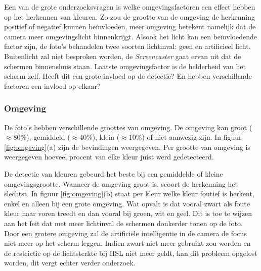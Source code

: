 Een van de grote onderzoeksvragen is welke omgevingsfactoren een effect hebben op het herkennen van kleuren. Zo zou de grootte van de omgeving de herkenning positief of negatief kunnen beïnvloeden, meer omgeving betekent namelijk dat de camera meer omgevingslicht binnenkrijgt. Alsook het licht kan een beïnvloedende factor zijn, de foto's behandelen twee soorten lichtinval: geen en artificieel licht. Buitenlicht zal niet besproken worden, de {\it Screencaster} gaat ervan uit dat de schermen binnenshuis staan. Laatste omgevingsfactor is de helderheid van het scherm zelf. Heeft dit een grote invloed op de detectie? En hebben verschillende factoren een invloed op elkaar?

\subsubsection{Omgeving}
De foto's hebben verschillende groottes van omgeving. De omgeving kan groot ($\approx 80\%$), gemiddeld ($\approx 40\%$), klein ($\approx 10\%$) of niet aanwezig zijn. In figuur \ref{fig:omgeving}(a) zijn de bevindingen weergegeven. Per grootte van omgeving is weergegeven hoeveel procent van elke kleur juist werd gedetecteerd.

De detectie van kleuren gebeurd het beste bij een gemiddelde of kleine omgevingsgrootte. Wanneer de omgeving groot is, scoort de herkenning het slechtst. In figuur \ref{fig:omgeving}(b) staat per kleur welke kleur foutief is herkent, enkel en alleen bij een grote omgeving. Wat opvalt is dat vooral zwart als foute kleur naar voren treedt en dan vooral bij groen, wit en geel. Dit is toe te wijzen aan het feit dat met meer lichtinval de schermen donkerder tonen op de foto. Door een grotere omgeving zal de artificiële intelligentie in de camera de focus niet meer op het scherm leggen. Indien zwart niet meer gebruikt zou worden en de restrictie op de lichtsterkte bij HSL niet meer geldt, kan dit probleem opgelost worden, dit vergt echter verder onderzoek.

